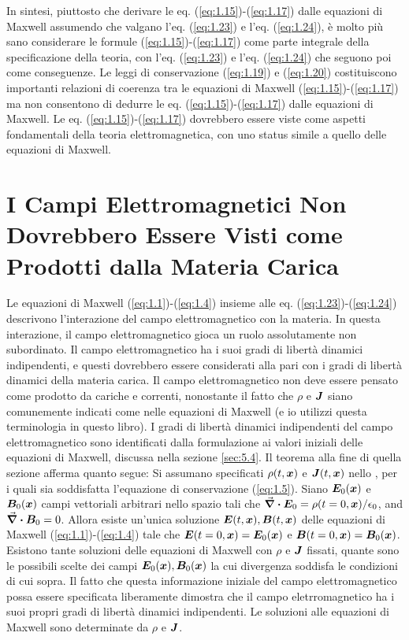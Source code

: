 In sintesi, piuttosto che derivare le eq. (\ref{eq:1.15})-(\ref{eq:1.17}) dalle equazioni di Maxwell assumendo che valgano l'eq. (\ref{eq:1.23}) e l'eq. (\ref{eq:1.24}), è molto più sano considerare le formule (\ref{eq:1.15})-(\ref{eq:1.17}) come parte integrale della specificazione della teoria, con l'eq. (\ref{eq:1.23}) e l'eq. (\ref{eq:1.24}) che seguono poi come conseguenze. Le leggi di conservazione (\ref{eq:1.19}) e (\ref{eq:1.20}) costituiscono importanti relazioni di coerenza tra le equazioni di Maxwell (\ref{eq:1.15})-(\ref{eq:1.17}) ma non consentono di dedurre le eq. (\ref{eq:1.15})-(\ref{eq:1.17}) dalle equazioni di Maxwell. Le eq. (\ref{eq:1.15})-(\ref{eq:1.17}) dovrebbero essere viste come aspetti fondamentali della teoria elettromagnetica, con uno status simile a quello delle equazioni di Maxwell.

\section{I Campi Elettromagnetici Non Dovrebbero Essere Visti come Prodotti dalla Materia Carica}\label{sec:1.3}
Le equazioni di Maxwell (\ref{eq:1.1})-(\ref{eq:1.4}) insieme alle eq. (\ref{eq:1.23})-(\ref{eq:1.24}) descrivono l'interazione del campo elettromagnetico con la materia. In questa interazione, il campo elettromagnetico gioca un ruolo assolutamente non subordinato. Il campo elettromagnetico ha i suoi gradi di libertà dinamici indipendenti, e questi dovrebbero essere considerati alla pari con i gradi di libertà dinamici della materia carica. Il campo elettromagnetico non deve essere pensato come prodotto da cariche e correnti, nonostante il fatto che $\rho$ e $\vb*{J}$ siano comunemente indicati come  nelle equazioni di Maxwell (e io utilizzi questa terminologia in questo libro). I gradi di libertà dinamici indipendenti del campo elettromagnetico sono identificati dalla formulazione ai valori iniziali delle equazioni di Maxwell, discussa nella sezione \ref{sec:5.4}. Il teorema alla fine di quella sezione afferma quanto segue: 
Si assumano specificati $\rho(t, \vb*{x})$ e $\vb*{J}(t, \vb*{x})$ nello , per i quali sia soddisfatta l'equazione di conservazione (\ref{eq:1.5}). 
Siano $\vb*{E}_0(\vb*{x})$ e $\vb*{B}_0(\vb*{x})$ campi vettoriali arbitrari nello spazio tali che $\div{\vb*{E}_0} = \rho(t=0, \vb*{x})/\epsilon_0$, and $\div{\vb*{B}_0} = 0$. 
Allora esiste un'unica soluzione $\vb*{E}(t, \vb*{x}), \vb*{B}(t, \vb*{x})$ delle equazioni di Maxwell (\ref{eq:1.1})-(\ref{eq:1.4}) tale che 
$\vb*{E}(t=0, \vb*{x}) = \vb*{E}_0(\vb*{x})$ e $\vb*{B}(t=0, \vb*{x}) = \vb*{B}_0(\vb*{x})$. Esistono tante soluzioni delle equazioni di Maxwell con 
$\rho$ e $\vb*{J}$ fissati, quante sono le possibili scelte dei campi $\vb*{E}_0(\vb*{x}), \vb*{B}_0(\vb*{x})$ la cui divergenza soddisfa le condizioni di cui sopra. Il fatto che questa informazione iniziale del campo elettromagnetico possa essere specificata liberamente dimostra che il campo eletrromagnetico ha i suoi propri gradi di libertà dinamici indipendenti. Le soluzioni alle equazioni di Maxwell  sono determinate da $\rho$ e $\vb*{J}$.

